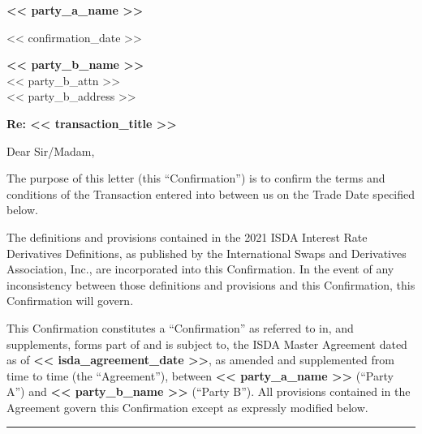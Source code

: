 \documentclass[11pt, a4paper]{article}
\begin{document}

\begin{center}
    \textbf{<< party_a_name >>}
\end{center}
\vspace{0.3cm}

\begin{flushright}
    << confirmation_date >>
\end{flushright}

\vspace{0.3cm}
\noindent \textbf{<< party_b_name >>} \\
\noindent << party_b_attn >> \\
\noindent << party_b_address >>

\vspace{0.5cm}
\noindent \textbf{Re: << transaction_title >>}

\vspace{0.3cm}
\noindent Dear Sir/Madam,

\vspace{0.3cm}
\noindent The purpose of this letter (this ``Confirmation'') is to confirm the terms and conditions of the Transaction entered into between us on the Trade Date specified below.

\vspace{0.3cm}
\noindent The definitions and provisions contained in the 2021 ISDA Interest Rate Derivatives Definitions, as published by the International Swaps and Derivatives Association, Inc., are incorporated into this Confirmation. In the event of any inconsistency between those definitions and provisions and this Confirmation, this Confirmation will govern.

\vspace{0.3cm}
\noindent This Confirmation constitutes a ``Confirmation'' as referred to in, and supplements, forms part of and is subject to, the ISDA Master Agreement dated as of \textbf{<< isda_agreement_date >>}, as amended and supplemented from time to time (the ``Agreement''), between \textbf{<< party_a_name >>} (``Party A'') and \textbf{<< party_b_name >>} (``Party B''). All provisions contained in the Agreement govern this Confirmation except as expressly modified below.

\vspace{0.5cm}
\hrule
\vspace{0.5cm}
\end{document}
